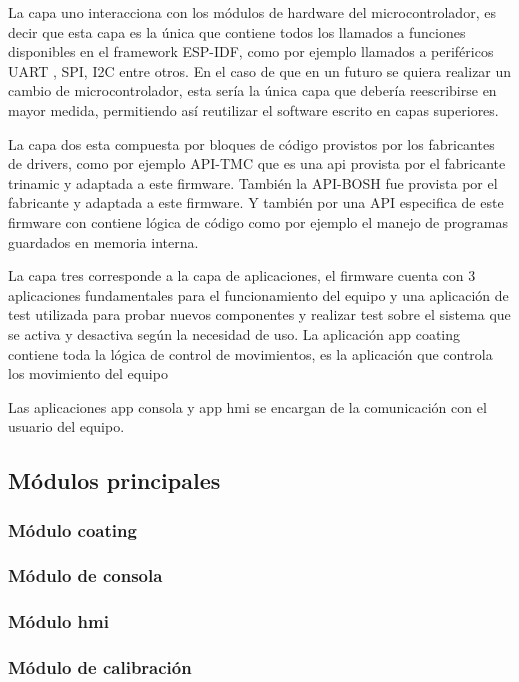 La capa uno interacciona con los módulos de hardware del microcontrolador, es decir que esta capa es la única que contiene todos los llamados a funciones disponibles en el framework ESP-IDF, como por ejemplo llamados a periféricos  UART , SPI, I2C entre otros. En el caso de que en un futuro se quiera realizar un cambio de microcontrolador, esta sería la única capa que debería reescribirse en mayor medida, permitiendo así reutilizar el software escrito en capas superiores.

La capa dos esta compuesta por bloques de código provistos por los fabricantes de drivers, como por ejemplo API-TMC que es una api provista por el fabricante trinamic y adaptada a este firmware. También la API-BOSH fue provista por el fabricante y adaptada a este firmware. Y también por una API especifica de este firmware con contiene lógica de código como por ejemplo el manejo de programas guardados en memoria interna. 


La capa tres corresponde a la capa de aplicaciones, el firmware cuenta con 3 aplicaciones fundamentales para el funcionamiento del equipo y una aplicación de test utilizada para probar nuevos componentes y realizar test sobre el sistema que se activa y desactiva según la necesidad de uso.
La aplicación app coating contiene toda la lógica de control de movimientos, es la aplicación que controla los movimiento del equipo

Las aplicaciones app consola y app hmi se encargan de la comunicación con el usuario del equipo.

\subsection{Módulos principales}
\subsubsection{Módulo coating}
\subsubsection{Módulo de consola}
\subsubsection{Módulo hmi}
\subsubsection{Módulo de calibración}

